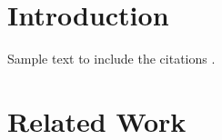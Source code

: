 \section{Introduction}
Sample text to include the citations \cite{darwin2010autobiography,lecun2015deep}.
\section{Related Work}


